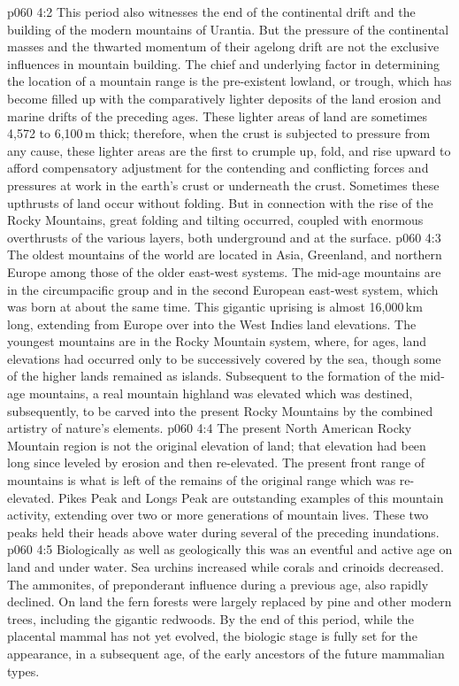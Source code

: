 \vs p060 4:2 This period also witnesses the end of the continental drift and the building of the modern mountains of Urantia. But the pressure of the continental masses and the thwarted momentum of their agelong drift are not the exclusive influences in mountain building. The chief and underlying factor in determining the location of a mountain range is the pre\hyp{}existent lowland, or trough, which has become filled up with the comparatively lighter deposits of the land erosion and marine drifts of the preceding ages. These lighter areas of land are sometimes 4,572 to 6,100\,m thick; therefore, when the crust is subjected to pressure from any cause, these lighter areas are the first to crumple up, fold, and rise upward to afford compensatory adjustment for the contending and conflicting forces and pressures at work in the earth’s crust or underneath the crust. Sometimes these upthrusts of land occur without folding. But in connection with the rise of the Rocky Mountains, great folding and tilting occurred, coupled with enormous overthrusts of the various layers, both underground and at the surface.
\vs p060 4:3 \pc The oldest mountains of the world are located in Asia, Greenland, and northern Europe among those of the older east\hyp{}west systems. The mid\hyp{}age mountains are in the circumpacific group and in the second European east\hyp{}west system, which was born at about the same time. This gigantic uprising is almost 16,000\,km long, extending from Europe over into the West Indies land elevations. The youngest mountains are in the Rocky Mountain system, where, for ages, land elevations had occurred only to be successively covered by the sea, though some of the higher lands remained as islands. Subsequent to the formation of the mid\hyp{}age mountains, a real mountain highland was elevated which was destined, subsequently, to be carved into the present Rocky Mountains by the combined artistry of nature’s elements.
\vs p060 4:4 The present North American Rocky Mountain region is not the original elevation of land; that elevation had been long since leveled by erosion and then re\hyp{}elevated. The present front range of mountains is what is left of the remains of the original range which was re\hyp{}elevated. Pikes Peak and Longs Peak are outstanding examples of this mountain activity, extending over two or more generations of mountain lives. These two peaks held their heads above water during several of the preceding inundations.
\vs p060 4:5 Biologically as well as geologically this was an eventful and active age on land and under water. Sea urchins increased while corals and crinoids decreased. The ammonites, of preponderant influence during a previous age, also rapidly declined. On land the fern forests were largely replaced by pine and other modern trees, including the gigantic redwoods. By the end of this period, while the placental mammal has not yet evolved, the biologic stage is fully set for the appearance, in a subsequent age, of the early ancestors of the future mammalian types.
